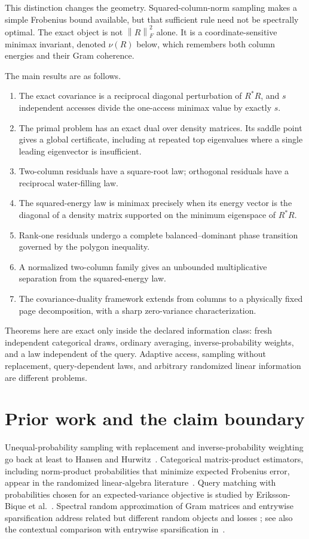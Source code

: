 \documentclass[11pt]{article}
\theoremstyle{definition}
\newcommand{\norm}[1]{\left\lVert #1\right\rVert}
\begin{document}
This distinction changes the geometry.  Squared-column-norm sampling makes a simple Frobenius
bound available, but that sufficient rule need not be spectrally optimal.  The exact object is not
$\norm{R}_F^2$ alone.  It is a coordinate-sensitive minimax invariant, denoted $\nu(R)$ below,
which remembers both column energies and their Gram coherence.

The main results are as follows.
\begin{enumerate}[label=\textup{(\roman*)},leftmargin=2.1em]
  \item The exact covariance is a reciprocal diagonal perturbation of $R^*R$, and $s$
  independent accesses divide the one-access minimax value by exactly $s$.
  \item The primal problem has an exact dual over density matrices.  Its saddle point gives a
  global certificate, including at repeated top eigenvalues where a single leading eigenvector
  is insufficient.
  \item Two-column residuals have a square-root law; orthogonal residuals have a reciprocal
  water-filling law.
  \item The squared-energy law is minimax precisely when its energy vector is the diagonal of a
  density matrix supported on the minimum eigenspace of $R^*R$.
  \item Rank-one residuals undergo a complete balanced--dominant phase transition governed by
  the polygon inequality.
  \item A normalized two-column family gives an unbounded multiplicative separation from the
  squared-energy law.
  \item The covariance-duality framework extends from columns to a physically fixed page
  decomposition, with a sharp zero-variance characterization.
\end{enumerate}

Theorems here are exact only inside the declared information class: fresh independent
categorical draws, ordinary averaging, inverse-probability weights, and a law independent of the
query.  Adaptive access, sampling without replacement, query-dependent laws, and arbitrary
randomized linear information are different problems.

\section{Prior work and the claim boundary}

Unequal-probability sampling with replacement and inverse-probability weighting go back at least
to Hansen and Hurwitz~\cite{HansenHurwitz1943}.  Categorical matrix-product estimators, including
norm-product probabilities that minimize expected Frobenius error, appear in the randomized
linear-algebra literature~\cite[\S4.1, Lemmas 3--4]{DrineasKannanMahoney2006}.  Query matching with probabilities
chosen for an expected-variance objective is studied by Eriksson-Bique et
al.~\cite[\S\S2--4]{ErikssonBiqueEtAl2011}.  Spectral random approximation of Gram matrices and entrywise
sparsification address related but different random objects and losses
\cite[\S\S3--5]{HolodnakIpsen2015}; see also the contextual comparison with entrywise
sparsification in~\cite{AchlioptasMcSherry2007}.
\end{document}

